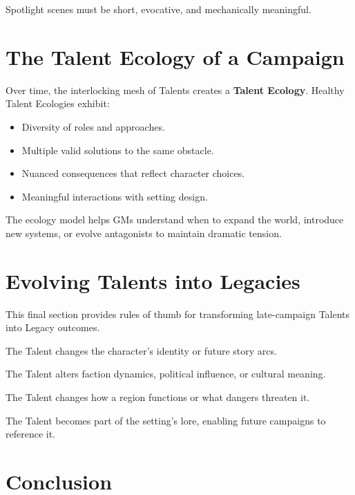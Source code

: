 \documentclass[11pt]{book}
\begin{document}
Spotlight scenes must be short, evocative, and mechanically meaningful.

\section{The Talent Ecology of a Campaign}

Over time, the interlocking mesh of Talents creates a \textbf{Talent Ecology}.
Healthy Talent Ecologies exhibit:

\begin{itemize}
    \item Diversity of roles and approaches.
    \item Multiple valid solutions to the same obstacle.
    \item Nuanced consequences that reflect character choices.
    \item Meaningful interactions with setting design.
\end{itemize}

The ecology model helps GMs understand when to expand the world,
introduce new systems, or evolve antagonists to maintain dramatic tension.

\section{Evolving Talents into Legacies}

This final section provides rules of thumb for transforming late-campaign Talents into Legacy outcomes.

\begin{description}[leftmargin=1.8em]
    \item[Personal Legacy]  
    The Talent changes the character's identity or future story arcs.

    \item[Social Legacy]  
    The Talent alters faction dynamics, political influence, or cultural meaning.

    \item[Environmental Legacy]  
    The Talent changes how a region functions or what dangers threaten it.

    \item[Mythic Legacy]  
    The Talent becomes part of the setting's lore, enabling future campaigns to reference it.
\end{description}

\section{Conclusion}
\end{document}
